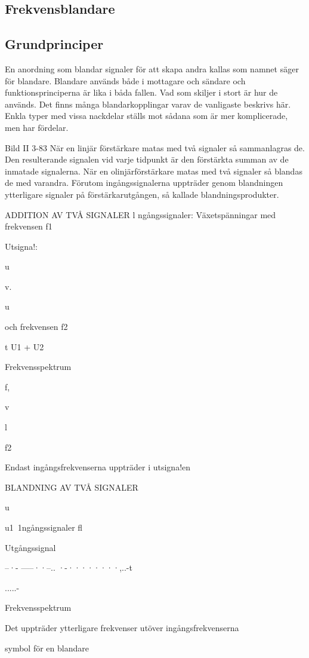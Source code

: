 \subsection{Frekvensblandare}

\subsection{Grundprinciper}

En anordning som blandar signaler för att
skapa andra kallas som namnet säger för
blandare. Blandare används både i mottagare och sändare och funktionsprinciperna
är lika i båda fallen. Vad som skiljer i stort är
hur de används.
Det finns många blandarkopplingar varav de vanligaste beskrivs här. Enkla typer
med vissa nackdelar ställs mot sådana som
är mer komplicerade, men har fördelar.

Bild II 3-83
När en linjär förstärkare matas med två
signaler så sammanlagras de. Den resulterande signalen vid varje tidpunkt är den
förstärkta summan av de inmatade signalerna.
När en olinjärförstärkare matas med två
signaler så blandas de med varandra. Förutom ingångssignalerna uppträder genom
blandningen ytterligare signaler på förstärkarutgången, så kallade blandningsprodukter.

ADDITION AV TVÅ SIGNALER
l ngångssignaler:
Växetspänningar med frekvensen f1

Utsigna!:

u

v.

u

och frekvensen f2

t U1 + U2

Frekvensspektrum

f,

v

l

f2

Endast ingångsfrekvenserna
uppträder i utsigna!en

BLANDNING AV TVÅ SIGNALER

u

u1~1ngångssignaler
fl

Utgångssignal

--·- -----··--.. ·-········,..-t

.....-

Frekvensspektrum

Det uppträder ytterligare frekvenser
utöver ingångsfrekvenserna

symbol för en blandare

